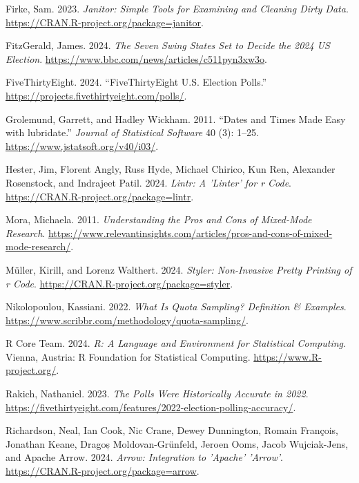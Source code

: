 \documentclass[
  letterpaper,
  DIV=11,
  numbers=noendperiod]{scrartcl}
\newlength{\cslhangindent}
\newlength{\cslentryspacingunit} %
\newenvironment{CSLReferences}[2] %
 {%
  \setlength{\parindent}{0pt}
  \ifodd #1
  \let\oldpar\par
  \def\par{\hangindent=\cslhangindent\oldpar}
  \fi
  \setlength{\parskip}{#2\cslentryspacingunit}
 }%
 {}
\begin{document}
\begin{CSLReferences}{1}{0}
\leavevmode{}%
Firke, Sam. 2023. \emph{Janitor: Simple Tools for Examining and Cleaning
Dirty Data}. \url{https://CRAN.R-project.org/package=janitor}.

\leavevmode{}%
FitzGerald, James. 2024. \emph{The Seven Swing States Set to Decide the
2024 US Election}. \url{https://www.bbc.com/news/articles/c511pyn3xw3o}.

\leavevmode{}%
FiveThirtyEight. 2024. {``{FiveThirtyEight U.S. Election Polls}.''}
\url{https://projects.fivethirtyeight.com/polls/}.

\leavevmode{}%
Grolemund, Garrett, and Hadley Wickham. 2011. {``Dates and Times Made
Easy with {lubridate}.''} \emph{Journal of Statistical Software} 40 (3):
1--25. \url{https://www.jstatsoft.org/v40/i03/}.

\leavevmode{}%
Hester, Jim, Florent Angly, Russ Hyde, Michael Chirico, Kun Ren,
Alexander Rosenstock, and Indrajeet Patil. 2024. \emph{Lintr: A 'Linter'
for r Code}. \url{https://CRAN.R-project.org/package=lintr}.

\leavevmode{}%
Mora, Michaela. 2011. \emph{Understanding the Pros and Cons of
Mixed-Mode Research}.
\url{https://www.relevantinsights.com/articles/pros-and-cons-of-mixed-mode-research/}.

\leavevmode{}%
Müller, Kirill, and Lorenz Walthert. 2024. \emph{Styler: Non-Invasive
Pretty Printing of r Code}.
\url{https://CRAN.R-project.org/package=styler}.

\leavevmode{}%
Nikolopoulou, Kassiani. 2022. \emph{What Is Quota Sampling? \textbar{}
Definition \& Examples}.
\url{https://www.scribbr.com/methodology/quota-sampling/}.

\leavevmode{}%
R Core Team. 2024. \emph{R: A Language and Environment for Statistical
Computing}. Vienna, Austria: R Foundation for Statistical Computing.
\url{https://www.R-project.org/}.

\leavevmode{}%
Rakich, Nathaniel. 2023. \emph{The Polls Were Historically Accurate in
2022}.
\url{https://fivethirtyeight.com/features/2022-election-polling-accuracy/}.

\leavevmode{}%
Richardson, Neal, Ian Cook, Nic Crane, Dewey Dunnington, Romain
François, Jonathan Keane, Dragoș Moldovan-Grünfeld, Jeroen Ooms, Jacob
Wujciak-Jens, and Apache Arrow. 2024. \emph{Arrow: Integration to
'Apache' 'Arrow'}. \url{https://CRAN.R-project.org/package=arrow}.


\end{CSLReferences}
\end{document}
